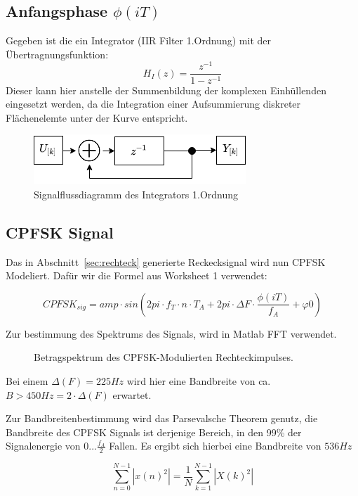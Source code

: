 \documentclass{article}
\begin{document}
\subsection{Anfangsphase $\phi(iT)$}

Gegeben ist die ein Integrator (IIR Filter 1.Ordnung) mit der Übertragnungsfunktion:
$$
H_I(z)=\frac{z^{-1}}{1-z^{-1}}
$$
Dieser kann hier anstelle der Summenbildung der komplexen Einhüllenden eingesetzt werden, 
da die Integration einer Aufsummierung diskreter Flächenelemte unter der Kurve entspricht.

\begin{figure}[!h]
    \centering
    \def\svgscale{0.3}
    \includegraphics{img/sig_IIR.png}
    \caption{Signalflussdiagramm des Integrators 1.Ordnung}
\end{figure}

\subsection{CPFSK Signal}
Das in Abschnitt~\ref{sec:rechteck} generierte Reckecksignal wird nun CPFSK Modeliert.
Dafür wir die Formel aus Worksheet 1 verwendet:

$$CPFSK_{sig} = amp \cdot  sin(2  pi \cdot f_T \cdot n \cdot T_A + 2 pi \cdot \varDelta{F} \cdot \frac{\phi (iT)}{f_A} + \varphi{0}) $$

Zur bestimmung des Spektrums des Signals, wird in Matlab FFT verwendet.
\begin{figure}[!h]
    \centering
    \def\svgscale{0.3}
    \def\svgwidth{\columnwidth}
    
    \caption{Betragspektrum des CPFSK-Modulierten Rechteckimpulses.}
\end{figure}
Bei einem $\varDelta(F) = 225Hz$ wird hier eine Bandbreite von ca. $B > 450Hz = 2\cdot \varDelta(F) $ erwartet.

Zur Bandbreitenbestimmung wird das Parsevalsche Theorem genutz, die Bandbreite des CPFSK Signals ist derjenige Bereich,
in den 99\% der Signalenergie von $0...\frac{f_A}{2}$ Fallen. Es ergibt sich hierbei eine Bandbreite von $536Hz$

$$
\sum_{n = 0}^{N - 1}\left\lvert x(n)^2\right\rvert =  \frac{1}{N} \sum_{k = 1}^{N-1}  \left\lvert X(k)^2\right\rvert 
$$
\end{document}
